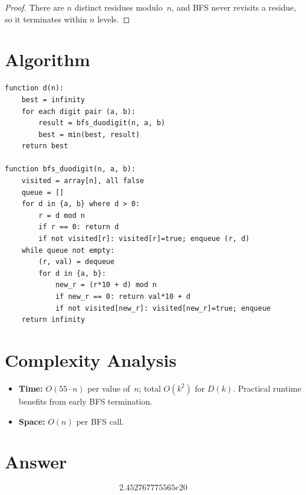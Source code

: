 \documentclass[11pt]{article}
\begin{document}
\begin{proof}
There are $n$ distinct residues modulo~$n$, and BFS never revisits a residue, so it terminates within $n$ levels.
\end{proof}

\section{Algorithm}

\begin{verbatim}
function d(n):
    best = infinity
    for each digit pair (a, b):
        result = bfs_duodigit(n, a, b)
        best = min(best, result)
    return best

function bfs_duodigit(n, a, b):
    visited = array[n], all false
    queue = []
    for d in {a, b} where d > 0:
        r = d mod n
        if r == 0: return d
        if not visited[r]: visited[r]=true; enqueue (r, d)
    while queue not empty:
        (r, val) = dequeue
        for d in {a, b}:
            new_r = (r*10 + d) mod n
            if new_r == 0: return val*10 + d
            if not visited[new_r]: visited[new_r]=true; enqueue
    return infinity
\end{verbatim}

\section{Complexity Analysis}

\begin{itemize}
    \item \textbf{Time:} $O(55 \cdot n)$ per value of~$n$; total $O(k^2)$ for $D(k)$. Practical runtime benefits from early BFS termination.
    \item \textbf{Space:} $O(n)$ per BFS call.
\end{itemize}

\section{Answer}

\[
\boxed{2.452767775565e20}
\]
\end{document}
